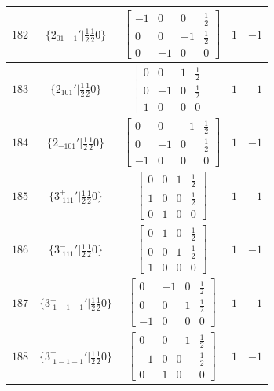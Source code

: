 \documentclass[fleqn,8pt]{jsarticle}
\begin{document}
\begin{longtable}{ccccc}
$ 182 $ & $ \{2{}_{01-1}{}'|\frac{1}{2} \frac{1}{2} 0\} $ & $ \begin{bmatrix} -1 & 0 & 0 & \frac{1}{2} \\ 0 & 0 & -1 & \frac{1}{2} \\ 0 & -1 & 0 & 0 \end{bmatrix} $ & $ 1 $ & $ -1 $ \\ \hline
$ 183 $ & $ \{2{}_{101}{}'|\frac{1}{2} \frac{1}{2} 0\} $ & $ \begin{bmatrix} 0 & 0 & 1 & \frac{1}{2} \\ 0 & -1 & 0 & \frac{1}{2} \\ 1 & 0 & 0 & 0 \end{bmatrix} $ & $ 1 $ & $ -1 $ \\ \hline
$ 184 $ & $ \{2{}_{-101}{}'|\frac{1}{2} \frac{1}{2} 0\} $ & $ \begin{bmatrix} 0 & 0 & -1 & \frac{1}{2} \\ 0 & -1 & 0 & \frac{1}{2} \\ -1 & 0 & 0 & 0 \end{bmatrix} $ & $ 1 $ & $ -1 $ \\ \hline
$ 185 $ & $ \{3^{+}_{\,\,111}{}'|\frac{1}{2} \frac{1}{2} 0\} $ & $ \begin{bmatrix} 0 & 0 & 1 & \frac{1}{2} \\ 1 & 0 & 0 & \frac{1}{2} \\ 0 & 1 & 0 & 0 \end{bmatrix} $ & $ 1 $ & $ -1 $ \\ \hline
$ 186 $ & $ \{3^{-}_{\,\,111}{}'|\frac{1}{2} \frac{1}{2} 0\} $ & $ \begin{bmatrix} 0 & 1 & 0 & \frac{1}{2} \\ 0 & 0 & 1 & \frac{1}{2} \\ 1 & 0 & 0 & 0 \end{bmatrix} $ & $ 1 $ & $ -1 $ \\ \hline
$ 187 $ & $ \{3^{-}_{\,\,1-1-1}{}'|\frac{1}{2} \frac{1}{2} 0\} $ & $ \begin{bmatrix} 0 & -1 & 0 & \frac{1}{2} \\ 0 & 0 & 1 & \frac{1}{2} \\ -1 & 0 & 0 & 0 \end{bmatrix} $ & $ 1 $ & $ -1 $ \\ \hline
$ 188 $ & $ \{3^{+}_{\,\,1-1-1}{}'|\frac{1}{2} \frac{1}{2} 0\} $ & $ \begin{bmatrix} 0 & 0 & -1 & \frac{1}{2} \\ -1 & 0 & 0 & \frac{1}{2} \\ 0 & 1 & 0 & 0 \end{bmatrix} $ & $ 1 $ & $ -1 $ \\ \hline

\end{longtable}
\end{document}
